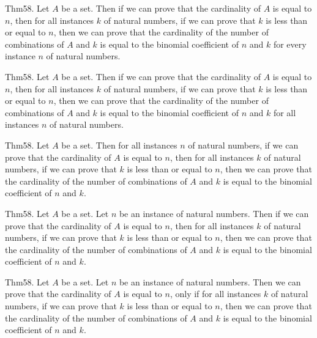 \documentclass{article}
\begin{document}
Thm58. Let $A$ be a set. Then if we can prove that the cardinality of $A$ is equal to $n$, then for all instances $k$ of natural numbers, if we can prove that $k$ is less than or equal to $n$, then we can prove that the cardinality of the number of combinations of $A$ and $k$ is equal to the binomial coefficient of $n$ and $k$ for every instance $n$ of natural numbers.

Thm58. Let $A$ be a set. Then if we can prove that the cardinality of $A$ is equal to $n$, then for all instances $k$ of natural numbers, if we can prove that $k$ is less than or equal to $n$, then we can prove that the cardinality of the number of combinations of $A$ and $k$ is equal to the binomial coefficient of $n$ and $k$ for all instances $n$ of natural numbers.

Thm58. Let $A$ be a set. Then for all instances $n$ of natural numbers, if we can prove that the cardinality of $A$ is equal to $n$, then for all instances $k$ of natural numbers, if we can prove that $k$ is less than or equal to $n$, then we can prove that the cardinality of the number of combinations of $A$ and $k$ is equal to the binomial coefficient of $n$ and $k$.

Thm58. Let $A$ be a set. Let $n$ be an instance of natural numbers. Then if we can prove that the cardinality of $A$ is equal to $n$, then for all instances $k$ of natural numbers, if we can prove that $k$ is less than or equal to $n$, then we can prove that the cardinality of the number of combinations of $A$ and $k$ is equal to the binomial coefficient of $n$ and $k$.

Thm58. Let $A$ be a set. Let $n$ be an instance of natural numbers. Then we can prove that the cardinality of $A$ is equal to $n$, only if for all instances $k$ of natural numbers, if we can prove that $k$ is less than or equal to $n$, then we can prove that the cardinality of the number of combinations of $A$ and $k$ is equal to the binomial coefficient of $n$ and $k$.
\end{document}
